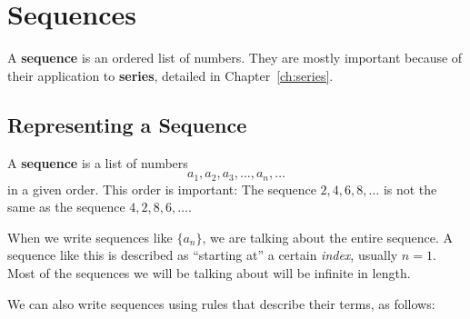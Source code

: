 \chapter{Sequences}
\label{ch:sequences}

%
A \textbf{sequence} is an ordered list of numbers. They are mostly important because of their application to \textbf{series},
detailed in Chapter~\ref{ch:series}.
\section{Representing a Sequence}
\begin{defn}
  A \textbf{sequence} is a list of numbers
  \[ a_1, a_2, a_3, \ldots, a_n, \ldots\]
  in a given order. This order is important: The sequence \(2, 4, 6, 8, \ldots\) is not the same as the sequence \(4, 2, 8, 6, \ldots\).
\end{defn}
When we write sequences like \(\{a_n\}\), we are talking about the entire
sequence. A sequence like this is described as ``starting at'' a certain \emph{index},
usually \(n=1\).
Most of the sequences we will be talking about will be infinite in length.

We can also write sequences using rules that describe their
terms, as follows:

